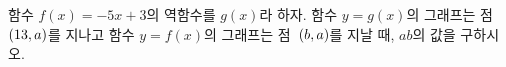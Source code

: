 함수 $f(x)=-5x+3$의 역함수를 $g(x)$라 하자. 함수 $y=g(x)$의 그래프는 점~$(13{,}\mkern3mu\mathopen{}a)$를 지나고 함수 $y=f(x)$의 그래프는 점~$(b{,}\mkern3mu\mathopen{}a)$를 지날 때, $ab$의 값을 구하시오.
